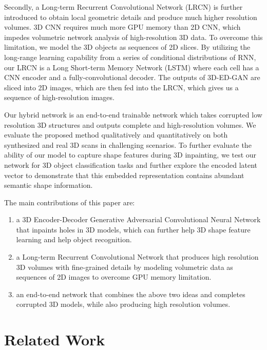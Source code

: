 \documentclass[10pt,twocolumn,letterpaper]{article}
\begin{document}
Secondly, a Long-term Recurrent Convolutional Network (LRCN) is further introduced to obtain local geometric details and produce much higher resolution volumes. 3D CNN requires much more GPU memory than 2D CNN, which impedes volumetric network analysis of high-resolution 3D data. To overcome this limitation, we model the 3D objects as sequences of 2D slices. By utilizing the long-range learning capability from a series of conditional distributions of RNN, our LRCN is a Long Short-term Memory Network (LSTM) where each cell has a CNN encoder and a fully-convolutional decoder. The outputs of 3D-ED-GAN are sliced into 2D images, which are then fed into the LRCN, which gives us a sequence of high-resolution images.

Our hybrid network is an end-to-end trainable network which takes corrupted low resolution 3D structures and outputs complete and high-resolution volumes. We evaluate the proposed method qualitatively and quantitatively on both synthesized and real 3D scans in challenging scenarios. To further evaluate the ability of our model to capture shape features during 3D inpainting, we test our network for 3D object classification tasks and further explore the encoded latent vector to demonstrate that this embedded representation contains abundant semantic shape information. 

The main contributions of this paper are:
\begin{enumerate}
\item a 3D Encoder-Decoder Generative Adversarial Convolutional Neural Network that inpaints holes in 3D models, which can further help 3D shape feature learning and help object recognition.
\item a Long-term Recurrent Convolutional Network that produces high resolution 3D volumes with fine-grained details by modeling volumetric data as sequences of 2D images to overcome GPU memory limitation.
\item an end-to-end network that combines the above two ideas and completes corrupted 3D models, while also producing high resolution volumes. 
\end{enumerate}







\section{Related Work}
\end{document}

